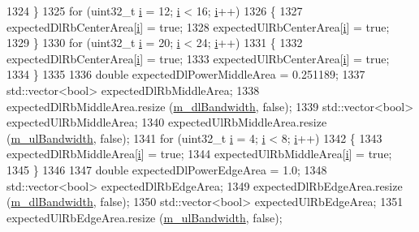 \begin{DoxyCode}
1324     \}
1325   \textcolor{keywordflow}{for} (uint32\_t \hyperlink{bernuolliDistribution_8m_a6f6ccfcf58b31cb6412107d9d5281426}{i} = 12; \hyperlink{bernuolliDistribution_8m_a6f6ccfcf58b31cb6412107d9d5281426}{i} < 16; \hyperlink{bernuolliDistribution_8m_a6f6ccfcf58b31cb6412107d9d5281426}{i}++)
1326     \{
1327       expectedDlRbCenterArea[\hyperlink{bernuolliDistribution_8m_a6f6ccfcf58b31cb6412107d9d5281426}{i}] = \textcolor{keyword}{true};
1328       expectedUlRbCenterArea[\hyperlink{bernuolliDistribution_8m_a6f6ccfcf58b31cb6412107d9d5281426}{i}] = \textcolor{keyword}{true};
1329     \}
1330   \textcolor{keywordflow}{for} (uint32\_t \hyperlink{bernuolliDistribution_8m_a6f6ccfcf58b31cb6412107d9d5281426}{i} = 20; \hyperlink{bernuolliDistribution_8m_a6f6ccfcf58b31cb6412107d9d5281426}{i} < 24; \hyperlink{bernuolliDistribution_8m_a6f6ccfcf58b31cb6412107d9d5281426}{i}++)
1331     \{
1332       expectedDlRbCenterArea[\hyperlink{bernuolliDistribution_8m_a6f6ccfcf58b31cb6412107d9d5281426}{i}] = \textcolor{keyword}{true};
1333       expectedUlRbCenterArea[\hyperlink{bernuolliDistribution_8m_a6f6ccfcf58b31cb6412107d9d5281426}{i}] = \textcolor{keyword}{true};
1334     \}
1335 
1336   \textcolor{keywordtype}{double} expectedDlPowerMiddleArea = 0.251189;
1337   std::vector<bool> expectedDlRbMiddleArea;
1338   expectedDlRbMiddleArea.resize (\hyperlink{classLteFrAreaTestCase_a645fc2cea287afbd373f6d702152cf47}{m\_dlBandwidth}, \textcolor{keyword}{false});
1339   std::vector<bool> expectedUlRbMiddleArea;
1340   expectedUlRbMiddleArea.resize (\hyperlink{classLteFrAreaTestCase_afa54487d9f12658bbead39e1272f4d8c}{m\_ulBandwidth}, \textcolor{keyword}{false});
1341   \textcolor{keywordflow}{for} (uint32\_t \hyperlink{bernuolliDistribution_8m_a6f6ccfcf58b31cb6412107d9d5281426}{i} = 4; \hyperlink{bernuolliDistribution_8m_a6f6ccfcf58b31cb6412107d9d5281426}{i} < 8; \hyperlink{bernuolliDistribution_8m_a6f6ccfcf58b31cb6412107d9d5281426}{i}++)
1342     \{
1343       expectedDlRbMiddleArea[\hyperlink{bernuolliDistribution_8m_a6f6ccfcf58b31cb6412107d9d5281426}{i}] = \textcolor{keyword}{true};
1344       expectedUlRbMiddleArea[\hyperlink{bernuolliDistribution_8m_a6f6ccfcf58b31cb6412107d9d5281426}{i}] = \textcolor{keyword}{true};
1345     \}
1346 
1347   \textcolor{keywordtype}{double} expectedDlPowerEdgeArea = 1.0;
1348   std::vector<bool> expectedDlRbEdgeArea;
1349   expectedDlRbEdgeArea.resize (\hyperlink{classLteFrAreaTestCase_a645fc2cea287afbd373f6d702152cf47}{m\_dlBandwidth}, \textcolor{keyword}{false});
1350   std::vector<bool> expectedUlRbEdgeArea;
1351   expectedUlRbEdgeArea.resize (\hyperlink{classLteFrAreaTestCase_afa54487d9f12658bbead39e1272f4d8c}{m\_ulBandwidth}, \textcolor{keyword}{false});

\end{DoxyCode}
